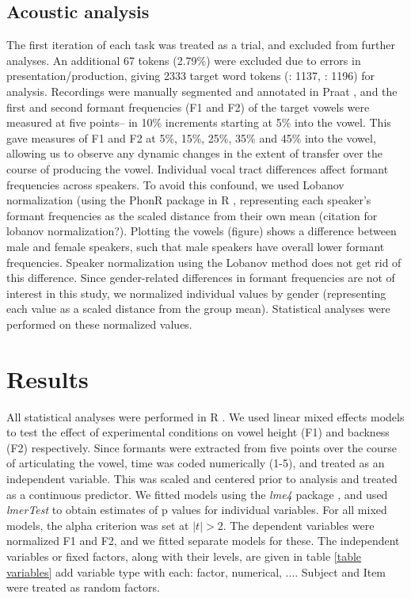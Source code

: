 \documentclass[12 pt]{article}
\newcommand{\nt}[1]{\textipa{[#1]}} %
\begin{document}
\subsection{Acoustic analysis}\label{analysis}
The first iteration of each task was treated as a trial, and excluded from further analyses. An additional 67 tokens (2.79\%) were excluded due to errors in presentation/production, giving 2333 target word tokens (\nt{2}: 1137, \nt{\ae}: 1196) for analysis. Recordings were manually segmented and annotated in Praat \citep{boersma2016praat}, and the first and second formant frequencies (F1 and F2) of the target vowels \nt{2, \ae} were measured at five points-- in 10\% increments starting at 5\% into the vowel. This gave measures of F1 and F2 at 5\%, 15\%, 25\%, 35\% and 45\% into the vowel, allowing us to observe any dynamic changes in the extent of transfer over the course of producing the vowel. Individual vocal tract differences affect formant frequencies across speakers. To avoid this confound, we used Lobanov normalization (using the PhonR package \citep{phonR} in R \citep{r}, representing each speaker's formant frequencies as the scaled distance from their own mean (\alert{citation for lobanov normalization?}). Plotting the vowels \alert{(figure)} shows a difference between male and female speakers, such that male speakers have overall lower formant frequencies. Speaker normalization using the Lobanov method does not get rid of this difference. Since gender-related differences in formant frequencies are not of interest in this study, we normalized individual values by gender (representing each value as a scaled distance from the group mean). Statistical analyses were performed on these normalized values. 


\section{Results} \label{results}

All statistical analyses were performed in R \citep{r}. We used linear mixed effects models to test the effect of experimental conditions on vowel height (F1) and backness (F2) respectively. Since formants were extracted from five points over the course of articulating the vowel, time was coded numerically (1-5), and treated as an independent variable. This was scaled and centered prior to analysis and treated as a continuous predictor. We fitted models using the \emph{lme4} package \citep{lme4}, and used \emph{lmerTest} \citep{lmerTest} to obtain estimates of p values for individual variables. For all mixed models, the alpha criterion was set at $|t| > 2 $. The dependent variables were normalized F1 and F2, and we fitted separate models for these. The independent variables or fixed factors, along with their levels, are given in table \ref{table variables} \alert{add variable type with each: factor, numerical, ...}. Subject and Item were treated as random factors.\\
\end{document}
